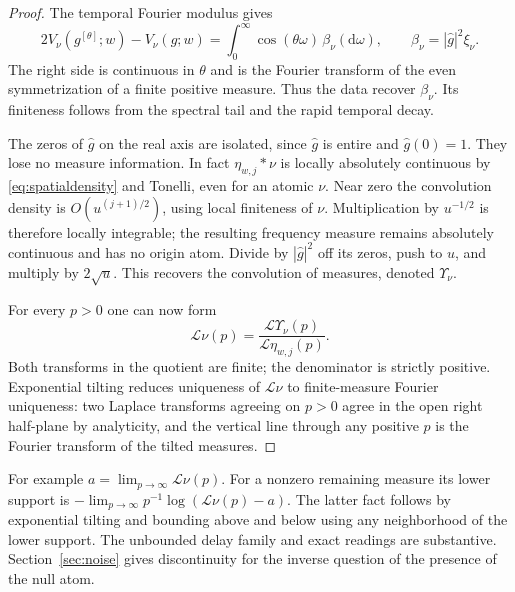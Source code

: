 \documentclass[11pt]{article}
\theoremstyle{remark}
\newcommand{\dd}{\mathrm d}
\newcommand{\scrL}{\mathcal L}
\begin{document}
\begin{proof}
The temporal Fourier modulus gives
\begin{equation}
 2V_\nu(g^{[\theta]};w)-V_\nu(g;w)=
        \int_0^\infty \cos(\theta\omega)\,\beta_\nu(\dd\omega),
 \qquad \beta_\nu=|\widehat g|^2\xi_\nu .
 \label{eq:cosine}
\end{equation}
The right side is continuous in \(\theta\) and is the Fourier
transform of the even symmetrization of a finite positive measure.
Thus the data recover \(\beta_\nu\). Its finiteness follows from
the spectral tail and the rapid temporal decay.

The zeros of \(\widehat g\) on the real axis are isolated, since
\(\widehat g\) is entire and \(\widehat g(0)=1\). They lose no
measure information. In fact \(\eta_{w,j}*\nu\) is locally
absolutely continuous by \eqref{eq:spatialdensity} and Tonelli,
even for an atomic \(\nu\). Near zero the convolution density is
\(O(u^{(j+1)/2})\), using local finiteness of \(\nu\).
Multiplication by \(u^{-1/2}\) is therefore locally integrable;
the resulting frequency measure remains absolutely continuous
and has no origin atom. Divide by \(|\widehat g|^2\) off its zeros,
push to \(u\), and multiply by \(2\sqrt u\). This recovers the
convolution of measures, denoted \(\Upsilon_\nu\).

For every \(p>0\) one can now form
\begin{equation}
       \scrL\nu(p)=
        \frac{\scrL\Upsilon_\nu(p)}{\scrL\eta_{w,j}(p)}.
 \label{eq:laplace}
\end{equation}
Both transforms in the quotient are finite; the denominator is
strictly positive. Exponential tilting reduces uniqueness of
\(\scrL\nu\) to finite-measure Fourier uniqueness: two Laplace
transforms agreeing on \(p>0\) agree in the open right half-plane
by analyticity, and the vertical line through any positive
\(p\) is the Fourier transform of the tilted measures.
\end{proof}

For example \(a=\lim_{p\to\infty}\scrL\nu(p)\).
For a nonzero remaining measure its lower support is
\(-\lim_{p\to\infty}p^{-1}\log(\scrL\nu(p)-a)\).
The latter fact follows by exponential tilting and bounding
above and below using any neighborhood of the lower support.
The unbounded delay family and exact readings are substantive.
Section~\ref{sec:noise} gives discontinuity for the inverse
question of the presence of the null atom.
\end{document}
